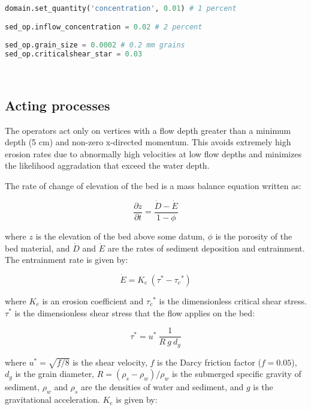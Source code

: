 \documentclass[10pt]{article}
\begin{document}
\begin{minipage}[c]{0.95\textwidth}
\begin{lstlisting}[language=Python, title=Modifying parameter values]
 
domain.set_quantity('concentration', 0.01) # 1 percent

sed_op.inflow_concentration = 0.02 # 2 percent
 
sed_op.grain_size = 0.0002 # 0.2 mm grains
sed_op.criticalshear_star = 0.03

\end{lstlisting}
\end{minipage}
\ \\

\subsection{Acting processes}

The operators act only on vertices with a flow depth greater than a minimum depth (5 cm) and non-zero x-directed momentum. This avoids extremely high erosion rates due to abnormally high velocities at low flow depths and minimizes the likelihood aggradation that exceed the water depth.

The rate of change of elevation of the bed is a mass balance equation written as:

\begin{equation}
\frac{\partial z}{\partial t} = \frac{\dot{D} - \dot{E}}{1 - \phi}
\end{equation}

\noindent where $z$ is the elevation of the bed above some datum, $\phi$ is the porosity of the bed material, and $\dot{D}$ and $\dot{E}$ are the rates of sediment deposition and entrainment. The entrainment rate is given by:

\begin{equation}
\dot{E} = K_e \: (\tau^* - {\tau_c}^*)
\end{equation}

\noindent where $K_e$ is an erosion coefficient and ${\tau_c}^*$ is the dimensionless critical shear stress. $\tau^*$ is the dimensionless shear stress that the flow applies on the bed:

\begin{equation}
\tau^* = u^* \: \frac{1}{R \: g \: d_g}
\end{equation}

\noindent where $u^* = \sqrt{f / 8}$ is the shear velocity, $f$ is the Darcy friction factor ($f = 0.05$), $d_g$ is the grain diameter, $R = (\rho_s - \rho_w) / \rho_w$ is the submerged specific gravity of sediment, $\rho_w$ and $\rho_s$ are the densities of water and sediment, and $g$ is the gravitational acceleration. $K_e$ is given by:
 
\end{document}
